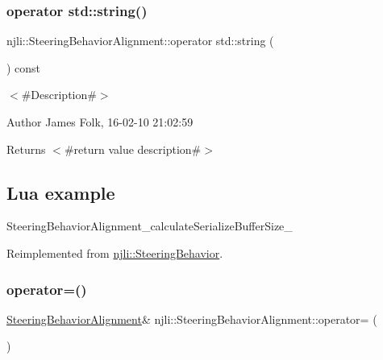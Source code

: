 \subsubsection{\texorpdfstring{operator std\+::string()}{operator std::string()}}
{\footnotesize\ttfamily njli\+::\+Steering\+Behavior\+Alignment\+::operator std\+::string (\begin{DoxyParamCaption}{ }\end{DoxyParamCaption}) const\hspace{0.3cm}{\ttfamily [virtual]}}



$<$\#\+Description\#$>$ 

\begin{DoxyAuthor}{Author}
James Folk, 16-\/02-\/10 21\+:02\+:59
\end{DoxyAuthor}
\begin{DoxyReturn}{Returns}
$<$\#return value description\#$>$
\end{DoxyReturn}
\hypertarget{classnjli_1_1_steering_behavior_wander_ex1}{}\subsection{Lua example}\label{classnjli_1_1_steering_behavior_wander_ex1}

\begin{DoxyCodeInclude}
\end{DoxyCodeInclude}
Steering\+Behavior\+Alignment\+\_\+calculate\+Serialize\+Buffer\+Size\+\_\+ 

Reimplemented from \mbox{\hyperlink{classnjli_1_1_steering_behavior_acd7af46e42a8a3fc1208a47f50836ac8}{njli\+::\+Steering\+Behavior}}.

\mbox{\label{classnjli_1_1_steering_behavior_alignment_a2ebd44d4aed19a49157962658c5c49b6}} 
\subsubsection{\texorpdfstring{operator=()}{operator=()}}
{\footnotesize\ttfamily \mbox{\hyperlink{classnjli_1_1_steering_behavior_alignment}{Steering\+Behavior\+Alignment}}\& njli\+::\+Steering\+Behavior\+Alignment\+::operator= (\begin{DoxyParamCaption}\item[{const \mbox{\hyperlink{classnjli_1_1_steering_behavior_alignment}{Steering\+Behavior\+Alignment}} \&}]{ }\end{DoxyParamCaption})\hspace{0.3cm}{\ttfamily [protected]}}

